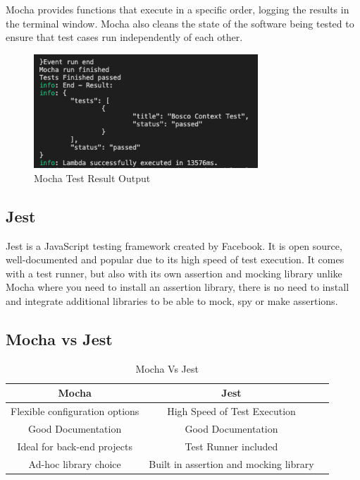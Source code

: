 \documentclass[12pt,a4paper,titlepage]{report}
\begin{document}
Mocha provides functions that execute in a specific order, logging the
results in the terminal window. Mocha also cleans the state of the software being tested to ensure that test
cases run independently of each other.

\begin{figure}[ht]
 \centering
 \includegraphics[width=0.75\textwidth,height=0.75\textwidth,keepaspectratio]{./diagrams/mocha_test_result.png}
 \caption{Mocha Test Result Output}
\end{figure}

\subsection{Jest}

Jest is a JavaScript testing framework created by Facebook. It is open source, well-documented and popular due to its
high speed of test execution. It comes with a test runner, but also with its own assertion and mocking library unlike Mocha where you need to install an assertion
library, there is no need to install and integrate additional libraries to be able to mock, spy or make assertions.

\subsection{Mocha vs Jest}

\begin{table}[ht]
 \centering
 \small
 \setlength\tabcolsep{6pt}
 \begin{tabular}{|c|c|c}
  \hline \textbf
  {Mocha}       & \textbf {Jest}\\
  \hline\hline
  Flexible configuration options & High Speed of Test Execution\\
  \hline
  Good Documentation       & Good Documentation\\
  \hline
  Ideal for back-end projects  & Test Runner included\\
  \hline
  Ad-hoc library choice     & Built in assertion and mocking library\\
  \hline
 \end{tabular}
 \caption{Mocha Vs Jest}
\label{table:mocha:jest}
\end{table}
\end{document}
